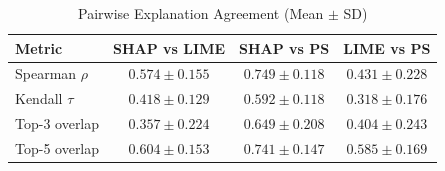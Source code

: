\begin{table}[htbp]
\centering
\caption{Pairwise Explanation Agreement (Mean $\pm$ SD)}
\label{tab:agreement}
\begin{tabular}{lccc}
\toprule
\textbf{Metric} & \textbf{SHAP vs LIME} & \textbf{SHAP vs PS} & \textbf{LIME vs PS} \\
\midrule
Spearman $\rho$ & $0.574 \pm 0.155$ & $0.749 \pm 0.118$ & $0.431 \pm 0.228$ \\
Kendall $\tau$ & $0.418 \pm 0.129$ & $0.592 \pm 0.118$ & $0.318 \pm 0.176$ \\
Top-3 overlap & $0.357 \pm 0.224$ & $0.649 \pm 0.208$ & $0.404 \pm 0.243$ \\
Top-5 overlap & $0.604 \pm 0.153$ & $0.741 \pm 0.147$ & $0.585 \pm 0.169$ \\
\bottomrule
\end{tabular}
\end{table}
